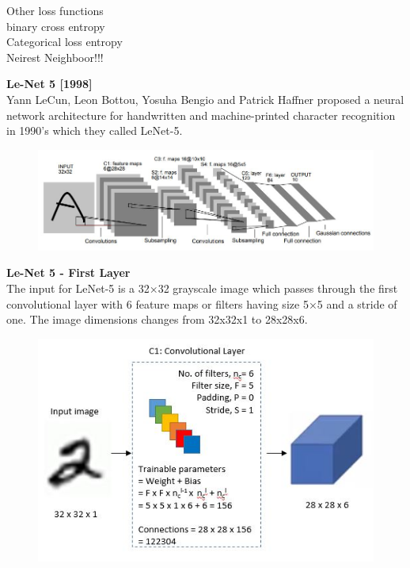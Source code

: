 \documentclass[10pt, compress]{beamer}
\begin{document}
\begin{frame}
  Other loss functions \\
  binary cross entropy \\
  Categorical loss entropy \\
  Neirest Neighboor!!!
\end{frame}

\begin{frame}
  \vspace{0.6cm}
  \textbf{Le-Net 5 [1998]} \\
  Yann LeCun, Leon Bottou, Yosuha Bengio and Patrick Haffner proposed a neural network architecture for handwritten and machine-printed character recognition in 1990’s which they called LeNet-5.
  \begin{figure}
    \includegraphics[width=.9\linewidth]{imgs/cnn/lenet}
  \end{figure}
\end{frame}

\begin{frame}
  \vspace{0.6cm}
  \textbf{Le-Net 5 - First Layer} \\
  The input for LeNet-5 is a 32×32 grayscale image which passes through the first convolutional layer with 6 feature maps or filters having size 5×5 and a stride of one. The image dimensions changes from 32x32x1 to 28x28x6.
  \begin{figure}
    \includegraphics[width=.75\linewidth]{imgs/cnn/LeNet_Layer1}
  \end{figure}
\end{frame}
\end{document}

